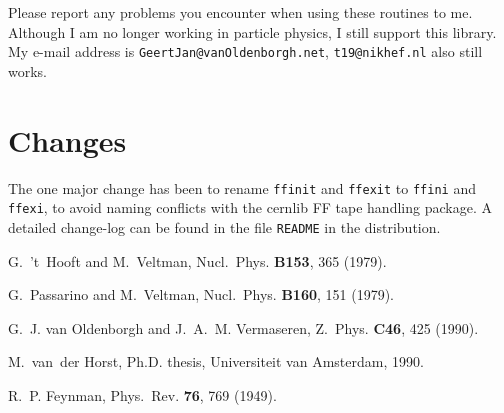 Please report any problems you encounter when using these routines to me.
Although I am no longer working in particle physics, I still support this 
library.  My e-mail address is {\tt GeertJan@vanOldenborgh.net}, 
{\tt t19@nikhef.nl} also still works.


\section{Changes}

The one major change has been to rename {\tt ffinit} and {\tt ffexit} to 
{\tt ffini} and {\tt ffexi}, to avoid naming conflicts with the cernlib FF 
tape handling package.  A detailed change-log can be found in the file 
{\tt README} in the distribution.


\begin{thebibliography}{1}

G.~'t~Hooft and M.~Veltman,
\newblock Nucl.~Phys. {\bf B153}, 365 (1979).

G.~Passarino and M.~Veltman,
\newblock Nucl.~Phys. {\bf B160}, 151 (1979).

G.~J. van Oldenborgh and J.~A.~M. Vermaseren,
\newblock Z.~Phys. {\bf C46}, 425 (1990).

M.~van~der Horst,
\newblock Ph.D. thesis, Universiteit van Amsterdam, 1990.

R.~P. Feynman,
\newblock Phys.~Rev. {\bf 76}, 769 (1949).

\end{thebibliography}


